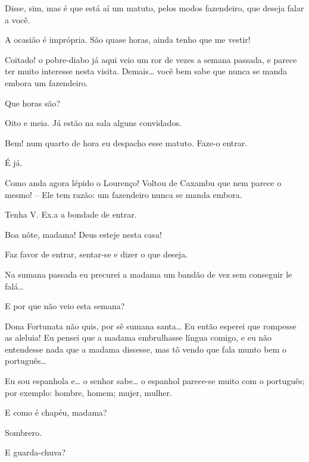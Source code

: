  Disse, sim, mas é que está aí um matuto, pelos modos fazendeiro,
que deseja falar a você.

 A ocasião é imprópria. São quase horas, ainda tenho que me vestir!

 Coitado! o pobre-diabo já aqui veio um ror de vezes a semana
passada, e parece ter muito interesse nesta visita. Demais\ldots{} você bem sabe
que nunca se manda embora um fazendeiro.

 Que horas são?

 Oito e meia. Já estão na sala alguns convidados.

 Bem! num quarto de hora eu despacho esse matuto. Faze-o entrar.

 É já. 

  Como anda agora lépido o Lourenço! Voltou de Caxambu que nem
parece o mesmo! -- Ele tem razão: um fazendeiro nunca se manda embora.

  Tenha V. Ex.a a
bondade de entrar. 


 Boa nôte, madama! Deus esteje nesta casa!

 Faz favor de entrar, sentar-se e dizer o que deseja. 

 Na sumana passada eu precurei a madama um bandão de vez sem
conseguir le falá\ldots{}

 E por que não veio esta semana?

 Dona Fortunata não quis, por sê sumana santa\ldots{} Eu então esperei
que rompesse as aleluia!  Eu pensei que a madama embrulhasse
língua comigo, e eu não entendesse nada que a madama dissesse, mas tô vendo que
fala munto bem o português\ldots{}

 Eu sou espanhola e\ldots{} o senhor sabe\ldots{} o espanhol parece-se muito
com o português; por exemplo: hombre, homem; mujer, mulher.

  E como é chapéu, madama?

 Sombrero.

 E guarda-chuva?

